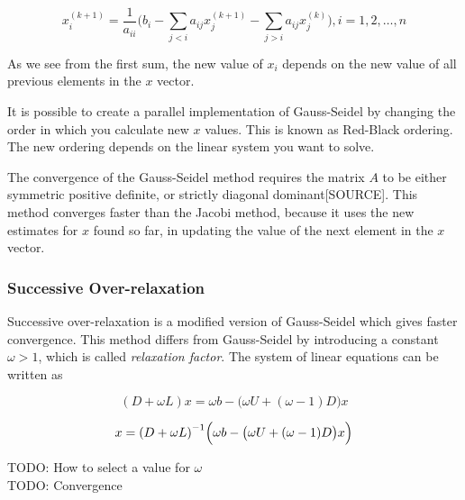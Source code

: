 $$ x_i^{(k+1)} = \frac{1}{a_{ii}} \Big( b_i - \sum_{j < i} a_{ij} x_j^{(k+1)} 
- \sum_{j > i} a_{ij} x_j^{(k)} \Big),  i = 1, 2, \ldots, n $$

As we see from the first sum, the new value of $x_i$ depends on the new value of 
all previous elements in the $x$ vector.

It is possible to create a parallel implementation of Gauss-Seidel by changing
the order in which you calculate new $x$ values. This is known as Red-Black
ordering. The new ordering depends on the linear system you want to solve.

The convergence of the Gauss-Seidel method requires the matrix $A$ to be either
symmetric positive definite, or strictly diagonal dominant[SOURCE]. This method
converges faster than the Jacobi method, because it uses the new estimates for
$x$ found so far, in updating the value of the next element in the $x$ vector.

\subsubsection*{Successive Over-relaxation}

Successive over-relaxation is a modified version of Gauss-Seidel which gives
faster convergence. This method differs from Gauss-Seidel by introducing a
constant $\omega > 1$, which is called \emph{relaxation factor}. The system of
linear equations can be written as

$$ (D + \omega L)x = \omega b - \big( \omega U + (\omega - 1)D \big)x $$

$$ x = {(D + \omega L)}^{-1} \Big( \omega b - \big( \omega U + (\omega - 1)D \big)x \Big) $$

TODO: How to select a value for $\omega$ \\
TODO: Convergence
